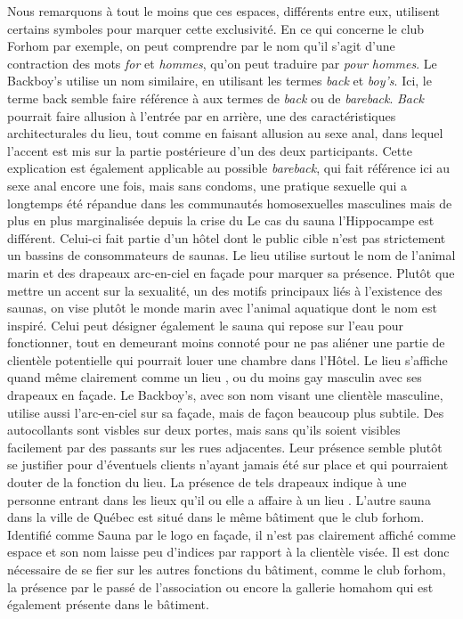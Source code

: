 Nous remarquons à tout le moins que ces espaces, différents entre eux, utilisent certains symboles pour marquer cette exclusivité.
En ce qui concerne le club Forhom par exemple, on peut comprendre par le nom qu'il s'agit d'une contraction des mots \emph{for} et \emph{hommes}, qu'on peut traduire par \emph{pour hommes}.
Le Backboy's utilise un nom similaire, en utilisant les termes \emph{back} et \emph{boy's}.
Ici, le terme back semble faire référence à aux termes de \emph{back} ou de \emph{bareback}.
\emph{Back} pourrait faire allusion à l'entrée par en arrière, une des caractéristiques architecturales du lieu, tout comme en faisant allusion au sexe anal, dans lequel l'accent est mis sur la partie postérieure d'un des deux participants.
Cette explication est également applicable au possible \emph{bareback}, qui fait référence ici au sexe anal encore une fois, mais sans condoms, une pratique sexuelle qui a longtemps été répandue dans les communautés homosexuelles masculines mais de plus en plus marginalisée depuis la crise du \sida{}
Le cas du sauna l'Hippocampe est différent.
Celui-ci fait partie d'un hôtel dont le public cible n'est pas strictement un bassins de consommateurs de saunas.
Le lieu utilise surtout le nom de l'animal marin et des drapeaux arc-en-ciel en façade pour marquer sa présence.
Plutôt que mettre un accent sur la sexualité, un des motifs principaux liés à l'existence des saunas, on vise plutôt le monde marin avec l'animal aquatique dont le nom est inspiré.
Celui peut désigner également le sauna qui repose sur l'eau pour fonctionner, tout en demeurant moins connoté pour ne pas aliéner une partie de clientèle potentielle qui pourrait louer une chambre dans l'Hôtel.
Le lieu s'affiche quand même clairement comme un lieu \lgbt{}, ou du moins gay masculin avec ses drapeaux en façade.
Le Backboy's, avec son nom visant une clientèle masculine, utilise aussi l'arc-en-ciel sur sa façade, mais de façon beaucoup plus subtile. 
Des autocollants sont visbles sur deux portes, mais sans qu'ils soient visibles facilement par des passants sur les rues adjacentes.
Leur présence semble plutôt se justifier pour d'éventuels clients n'ayant jamais été sur place et qui pourraient douter de la fonction du lieu.
La présence de tels drapeaux indique à une personne entrant dans les lieux qu'il ou elle a affaire à un lieu \lgbt{}.
L'autre sauna dans la ville de Québec est situé dans le même bâtiment que le club forhom.
Identifié comme Sauna par le logo en façade, il n'est pas clairement affiché comme espace \lgbt{} et son nom laisse peu d'indices par rapport à la clientèle visée.
Il est donc nécessaire de se fier sur les autres fonctions du bâtiment, comme le club forhom, la présence par le passé de l'association  ou encore la gallerie homahom qui est également présente dans le bâtiment.



